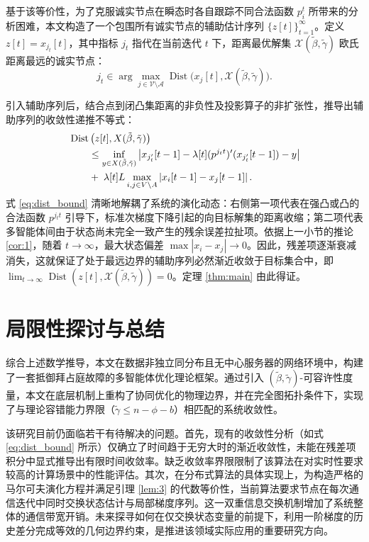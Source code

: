 \documentclass[12pt,hyperref,a4paper,UTF8]{ctexart}
\numberwithin{equation}{section}
\numberwithin{figure}{section}
\numberwithin{table}{section}
\begin{document}
基于该等价性，为了克服诚实节点在瞬态时各自跟踪不同合法函数 $p_i^t$ 所带来的分析困难，本文构造了一个包围所有诚实节点的辅助估计序列 $\{z[t]\}_{t=1}^\infty$。定义 $z[t] = x_{j_t}[t]$，其中指标 $j_t$ 指代在当前迭代 $t$ 下，距离最优解集 $\mathcal{X}(\tilde{\beta}, \tilde{\gamma})$ 欧氏距离最远的诚实节点：
\begin{equation}
    j_t \in \arg \max_{j \in \mathcal{V} \setminus \mathcal{A}} \operatorname{Dist}\Big(x_j[t], \mathcal{X}(\tilde{\beta}, \tilde{\gamma})\Big).
\end{equation}

引入辅助序列后，结合点到闭凸集距离的非负性及投影算子的非扩张性，推导出辅助序列的收敛性递推不等式：
\begin{align}
    & \operatorname{Dist} \left( z[t], X(\tilde{\beta}, \tilde{\gamma}) \right)  \notag \\
    & \qquad \leq \inf_{y \in X(\tilde{\beta}, \tilde{\gamma})} \left| x_{j'_t} [t - 1] - \lambda[t] (p^{j_t t})' (x_{j'_t} [t - 1]) - y \right|\notag \\
    & \qquad + \; \lambda[t] L \max_{i,j \in V \setminus A} \left| x_i [t - 1] - x_j [t - 1] \right|. \label{eq:dist_bound}
\end{align}
式 \eqref{eq:dist_bound} 清晰地解耦了系统的演化动态：右侧第一项代表在强凸或凸的合法函数 $p^{j_t t}$ 引导下，标准次梯度下降引起的向目标解集的距离收缩；第二项代表多智能体间由于状态尚未完全一致产生的残余误差拉扯项。依据上一小节的推论 \ref{cor:1}，随着 $t \to \infty$，最大状态偏差 $\max |x_i - x_j| \to 0$。因此，残差项逐渐衰减消失，这就保证了处于最远边界的辅助序列必然渐近收敛于目标集合中，即 $\lim_{t \to \infty} \operatorname{Dist}(z[t], \mathcal{X}(\tilde{\beta}, \tilde{\gamma})) = 0$。定理 \ref{thm:main} 由此得证。

\section{局限性探讨与总结}

\quad \quad  综合上述数学推导，本文在数据非独立同分布且无中心服务器的网络环境中，构建了一套抵御拜占庭故障的多智能体优化理论框架。通过引入 $(\tilde{\beta}, \tilde{\gamma})$-可容许性度量，本文在底层机制上重构了协同优化的物理边界，并在完全图拓扑条件下，实现了与理论容错能力界限（$\tilde{\gamma} \le n-\phi-b$）相匹配的系统收敛性。

该研究目前仍面临若干有待解决的问题。首先，现有的收敛性分析（如式 \ref{eq:dist_bound} 所示）仅确立了时间趋于无穷大时的渐近收敛性，未能在残差项积分中显式推导出有限时间收敛率。缺乏收敛率界限限制了该算法在对实时性要求较高的计算场景中的性能评估。其次，在分布式算法的具体实现上，为构造严格的马尔可夫演化方程并满足引理 \ref{lem:3} 的代数等价性，当前算法要求节点在每次通信迭代中同时交换状态估计与局部梯度序列。这一双重信息交换机制增加了系统整体的通信带宽开销。未来探寻如何在仅交换状态变量的前提下，利用一阶梯度的历史差分完成等效的几何边界约束，是推进该领域实际应用的重要研究方向。
\end{document}
